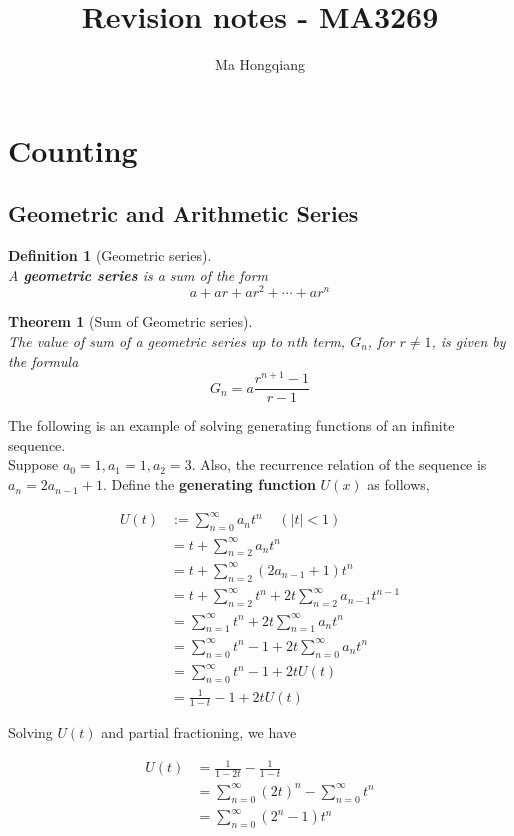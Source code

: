 \documentclass[12pt]{article}
\newtheorem{definition}{Definition}[section]
\newtheorem{theorem}{Theorem}[section]
\theoremstyle{definition}
\begin{document}
\title{Revision notes - MA3269}
\author{Ma Hongqiang}
\maketitle
\tableofcontents

\clearpage
\section{Counting}
\subsection{Geometric and Arithmetic Series}
\begin{definition}[Geometric series]
\hfill\\\normalfont A \textbf{geometric series} is a sum of the form
\[
a+ar+ar^2+\cdots+ar^n
\]
\end{definition}
\begin{theorem}[Sum of Geometric series]
\hfill\\\normalfont The value of sum of a geometric series up to $n$th term, $G_n$, for $r\neq 1$, is given by the formula
\[
G_n = a\frac{r^{n+1}-1}{r-1}
\]
\end{theorem}
The following is an example of solving generating functions of an infinite sequence.\\
Suppose $a_0 = 1, a_1 = 1, a_2 = 3$. Also, the recurrence relation of the sequence is $a_n = 2a_{n-1}+1$.
Define the \textbf{generating function} $U(x)$ as follows,

\begin{align*}
U(t)&:=\sum_{n=0}^\infty a_nt^n\;\;\;\;(|t|<1)\\
&=t+\sum_{n=2}^\infty a_nt^n\\
&=t+\sum_{n=2}^\infty (2a_{n-1}+1)t^n\\
&=t+\sum_{n=2}^\infty t^n+2t\sum_{n=2}^\infty a_{n-1}t^{n-1}\\
&=\sum_{n=1}^\infty t^n +2t\sum_{n=1}^\infty a_nt^n\\
&=\sum_{n=0}^\infty t^n-1+2t\sum_{n=0}^\infty a_nt^n\\
&=\sum_{n=0}^\infty t^n-1+2tU(t)\\
&=\frac{1}{1-t}-1+2tU(t)
\end{align*}

Solving $U(t)$ and partial fractioning, we have

\begin{align*}
U(t) &= \frac{1}{1-2t} - \frac{1}{1-t}\\
&=\sum_{n=0}^\infty (2t)^n -\sum_{n=0}^\infty t^n\\
&=\sum_{n=0}^\infty (2^n-1)t^n
\end{align*}
\end{document}
